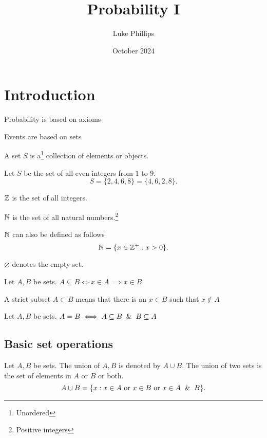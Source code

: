 \documentclass[10pt, a4paper]{article}
\title{Probability I}
\author{Luke Phillips}
\date{October 2024}
\begin{document}
\maketitle

\newpage

\tableofcontents

\newpage

\section{Introduction}

Probability is based on axioms


Events are based on sets

\begin{definition}
    A set $S$ is a\footnote{Unordered} collection of elements or objects.    
\end{definition}
\begin{example}
    Let $S$ be the set of all even integers from $1$ to $9$.
    \[
    S =  \{2, 4, 6, 8\} = \{4, 6, 2, 8\}.
    \]
\end{example}

$\mathbb{Z}$ is the set of all integers.

$\mathbb{N}$ is the set of all natural numbers.\footnote{Positive integers}

$\mathbb{N}$ can also be defined as follows
\[
\mathbb{N} = \{x \in \mathbb{Z}^+: x > 0\}.
\]

$\varnothing$ denotes the empty set.

\begin{definition}
    Let $A, B$ be sets. $A \subseteq B \iff x \in A \implies x \in B$.

    A strict subset $A \subset B$ means that there is an $x \in B$ such that $x \notin A$ 
\end{definition}

\begin{definition}
    Let $A, B$ be sets. $A = B \iff A\subseteq B \And B \subseteq A$
\end{definition}

\subsection{Basic set operations}

\begin{definition}
    Let $A, B$ be sets. The union of $A, B$ is denoted by $A \cup B$. The union of two sets is the set of elements in $A$ or $B$ or both.
    \[
    A \cup B = \{x: x \in A \text{ or } x \in B \text{ or } x \in A\And B\}.
    \]
\end{definition}
\end{document}
